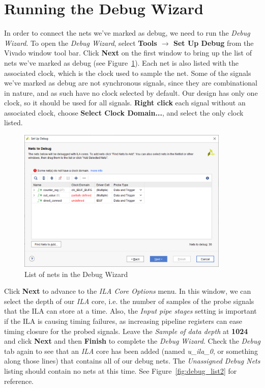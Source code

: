 \documentclass[11pt]{article}
\begin{document}
\section{Running the Debug Wizard}
\label{sec:debug_wiz}
In order to connect the nets we've marked as debug, we need to run the \textit{Debug Wizard}. To open the \textit{Debug Wizard}, select \textbf{Tools $\rightarrow$ Set Up Debug} from the Vivado window tool bar. Click \textbf{Next} on the first window to bring up the list of nets we've marked as debug (see Figure~\ref{fig:debug_wizard}). Each net is also listed with the associated clock, which is the clock used to sample the net. Some of the signals we've marked as debug are not synchronous signals, since they are combinational in nature, and as such have no clock selected by default. Our design has only one clock, so it should be used for all signals. \textbf{Right click} each signal without an associated clock, choose \textbf{Select Clock Domain...}, and select the only clock listed.

\begin{figure}[!h]
    \centering
    \includegraphics[width=0.9\textwidth]{images/debug_wizard.png}
    \caption{List of nets in the Debug Wizard}
    \label{fig:debug_wizard}
\end{figure}

\newpage
Click \textbf{Next} to advance to the \textit{ILA Core Options} menu. In this window, we can select the depth of our \textit{ILA} core, i.e. the number of samples of the probe signals that the ILA can store at a time. Also, the \textit{Input pipe stages} setting is important if the ILA is causing timing failures, as increasing pipeline registers can ease timing closure for the probed signals. Leave the \textit{Sample of data depth} at \textbf{1024} and click \textbf{Next} and then \textbf{Finish} to complete the \textit{Debug Wizard}. Check the \textit{Debug} tab again to see that an \textit{ILA} core has been added (named \textit{u\_ila\_0}, or something along those lines) that contains all of our debug nets. The \textit{Unassigned Debug Nets} listing should contain no nets at this time. See Figure~\ref{fig:debug_list2} for reference.
\end{document}

